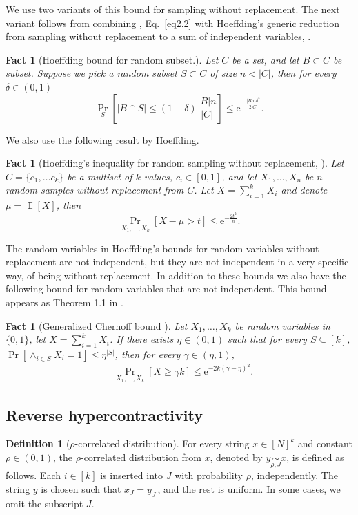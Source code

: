 \documentclass[11pt]{article}
\numberwithin{equation}{section}
\newtheorem{fact}[theorem]{Fact}
\theoremstyle{definition}
\newtheorem{definition}[theorem]{Definition}
\theoremstyle{plain}
\newcommand{\eee}{\mathrm e}
\newcommand{\Prob}[2][]{\Pr_{{#1}}\left[#2\right]} %
\DeclareMathOperator*{\E}{\mathbb{E}} %
\newcommand{\abs}[1]{\lvert#1\rvert} %
\newcommand{\set}[1]{\{#1\}} %
\newcommand\cor[1]{\underset{\scriptscriptstyle#1}{\sim}} %
\begin{document}
We use
%
two variants %
of this
%
bound for sampling without replacement.
%
%
The next variant %
%
follows from combining ,
Eq.~\eqref{eq2.2}   %
with Hoeffding’s generic reduction
from sampling without replacement to a sum of independent variables,
%
\cite[Theorem 4]{hoeffding1994probability}.  %
\begin{fact}[Hoeffding bound for random subset.]\label{fact:Chernoff-rep} %
%
	Let $C$ be a set, and let $B\subset C$ be  subset. Suppose we pick a random subset $S\subset C$ of size $n < \abs{C}$, then for every $\delta\in (0,1)$
	\[  \Prob[S]{\abs{B\cap S}\leq (1-\delta)\frac{\abs{B}n}{\abs{C}}}\leq \eee^{-\frac{\abs{B}n\delta^2}{2\abs{C}}}.  \]
\end{fact}
%
%
We also use the following result by Hoeffding. %
\begin{fact}[Hoeffding’s inequality for random sampling without replacement,
%
{\cite[Theorems 1 and 4]{hoeffding1994probability}} %
	]\label{fact:hoff-rep}
	Let $C=\set{c_1,\ldots c_k}$ be a 
	multiset %
	of $k$ values, $c_i\in[0,1]$, and let $X_1,\ldots, X_n$ be $n$ random samples without replacement from $C$. Let $X=\sum_{i=1}^k X_i$ and denote $\mu=\E[X]$, then
	\[ \Prob[X_1,\ldots, X_k]{{X-\mu}> t}\leq \eee^{-\frac{2t^2}{n}}. \]
\end{fact}

%
%
The random variables in Hoeffding’s bounds for random variables without replacement are not independent, but they are not independent in a very specific way, of being without replacement. In addition to these bounds we also have the following bound for random variables that are not independent. %
%
%
%
%
%
%
%
%
%
%
%
This bound appears as %
Theorem 1.1  %
in \cite{IK10}.
\begin{fact}[Generalized Chernoff bound \cite{IK10,PS97}]\label{fact:gen-cher}
Let $X_1,\ldots, X_k$ be random variables in $\{0,1\}$, let $X=\sum_{i=1}^k X_i$. If there exists $\eta\in(0,1)$ such that for every $S\subseteq [k]$, $\Pr[\wedge_{i\in S}X_i=1]\leq\eta^{\abs{S}}$, then for every $\gamma\in  (\eta,1)$,
\begin{align*}
	&\Prob[X_1,\ldots, X_k]{X \geq \gamma k}\leq \eee^{-2k(\gamma-\eta)^2}.
\end{align*}
\end{fact}


\subsection{Reverse hypercontractivity}
\begin{definition}[$\rho$-correlated distribution]
For every string $x\in[N]^k$ and constant $\rho\in(0,1)$, the $\rho$-correlated distribution from $x$, denoted by $y \cor{\rho,J}x$, %
is defined %
as follows.  Each  %
$i\in[k]$ is inserted into $J$ with probability $\rho$, independently.
%
%
%
The string $y$ %
is chosen
such that $x_J=y_J$\,, and the rest is uniform. In some cases, we omit the subscript $J$.
\end{definition}
\end{document}
